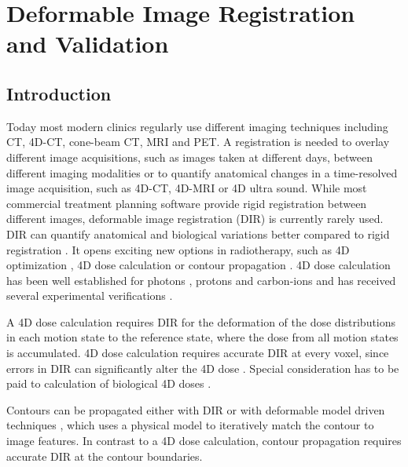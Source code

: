 \chapter{Deformable Image Registration and Validation}
\label{chapter:vmm}
\minitoc

\section{Introduction}


Today most modern clinics regularly use different imaging techniques including CT, 4D-CT, cone-beam CT, MRI and PET. A registration is needed to overlay different image acquisitions, such as images taken at different days,
between different imaging modalities or to quantify anatomical changes in a time-resolved image acquisition, such as 4D-CT, 4D-MRI or 4D ultra sound. While most commercial treatment planning software provide rigid registration between different images, deformable image registration (DIR) is currently rarely used. 
DIR can quantify anatomical and biological variations better compared to rigid registration \cite{Sarrut2006}. It opens exciting new options in radiotherapy, such as 4D optimization \cite{Trofimov2005}, 
4D dose calculation \cite{Flampouri2006} or contour propagation \cite{Lu2006b}. 4D dose calculation has been well established for photons \cite{Ong2016}, protons \cite{Paganetti2005} and carbon-ions \cite{Gemmel2011} and has received
several experimental verifications \cite{Vinogradskiy2009, Perrin2016, Bert2012a}. 

A 4D dose calculation requires DIR for the deformation of the dose distributions in each motion state
to the reference state, where the dose from all motion states is accumulated. 4D dose calculation requires accurate DIR at every voxel, since errors in DIR can significantly alter the 4D dose \cite{Heath2006}. Special consideration has to be paid to calculation of biological 4D doses \cite{Gemmel2011}. 

Contours can be propagated either with DIR \cite{Lu2006a, Rietzel2005a} or
with deformable model driven techniques \cite{McInerney1996}, which uses a physical model to iteratively match the contour to image features. In contrast to a 4D dose calculation, contour propagation requires accurate DIR at the contour boundaries.

